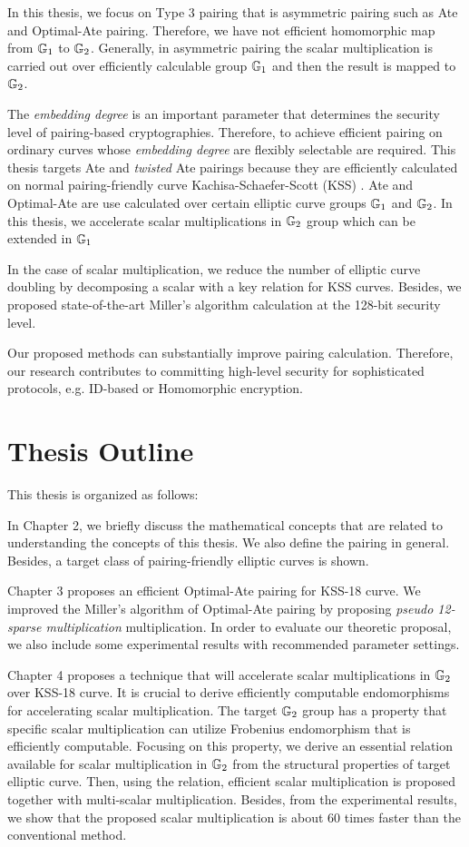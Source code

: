 In this thesis, we focus on Type 3 pairing that is asymmetric pairing such as Ate \cite{EPRINT:MKHO07} and Optimal-Ate \cite{DBLP:journals/tit/Vercauteren10} pairing.
Therefore, we have not efficient homomorphic map from ${\mathbb{G}}_{1}$ to ${\mathbb{G}}_{2}$. 
Generally, in asymmetric pairing the scalar multiplication is carried out over efficiently calculable group ${\mathbb{G}}_{1}$ and then the result is mapped to ${\mathbb{G}}_{2}$.

The {\it embedding degree} is an important parameter that determines the security level of pairing-based cryptographies.
Therefore, to achieve efficient pairing on ordinary curves whose {\it embedding degree} are flexibly selectable are required.
This thesis targets Ate and {\it twisted} Ate pairings because they are efficiently calculated on normal pairing-friendly curve Kachisa-Schaefer-Scott (KSS) \cite{EPRINT:KacSchSco07}.
Ate and Optimal-Ate are use calculated over certain elliptic curve groups ${\mathbb{G}}_{1}$ and ${\mathbb{G}}_{2}$.
In this thesis, we accelerate scalar multiplications in ${\mathbb{G}}_{2}$ group which can be extended in ${\mathbb{G}}_{1}$

In the case of scalar multiplication, we reduce the number of elliptic curve doubling by decomposing a scalar with a key relation for KSS curves.
Besides, we proposed state-of-the-art Miller's algorithm calculation at the 128-bit security level.

Our proposed methods can substantially improve pairing calculation.
Therefore, our research contributes to committing high-level security for sophisticated protocols, e.g. ID-based or Homomorphic encryption.

\section{Thesis Outline}
\label{ch1_sec_outline}
This thesis is organized as follows: 

In Chapter 2, we briefly discuss the mathematical concepts that are related to understanding the concepts of this thesis.
We also define the pairing in general. 
Besides, a target class of pairing-friendly elliptic curves is shown.

Chapter 3 proposes an efficient Optimal-Ate pairing for KSS-18 curve. 
We improved the Miller's algorithm of Optimal-Ate pairing by proposing \textit{pseudo 12-sparse multiplication} multiplication.
In order to evaluate our theoretic proposal, we also include some experimental results with recommended parameter settings.

Chapter 4 proposes a technique that will accelerate scalar multiplications in ${\mathbb{G}}_{2}$ over KSS-18 curve. 
It is crucial to derive efficiently computable endomorphisms for accelerating scalar multiplication.
The target ${\mathbb{G}}_{2}$ group has a property that specific scalar multiplication can utilize  Frobenius endomorphism that is efficiently computable.
Focusing on this property, we derive an essential relation available for scalar multiplication in ${\mathbb{G}}_{2}$ from the structural properties of target elliptic curve.
Then, using the relation, efficient scalar multiplication is proposed together with multi-scalar multiplication.
Besides, from the experimental results, we show that the proposed scalar multiplication is about 60 times faster than the conventional method.  

